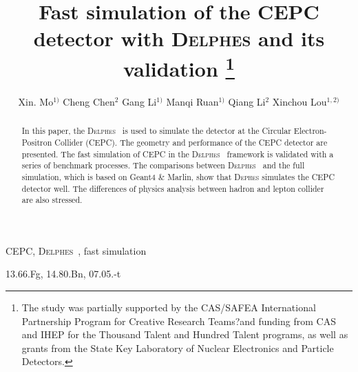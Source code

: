 \documentclass[a4paper,10pt,twoside]{cpc-hepnp}
\begin{document}



\title{Fast simulation of the CEPC detector with {\textsc{Delphes}} and its validation
\thanks{The study was partially supported by the CAS/SAFEA International Partnership Program for Creative Research Teams?and funding from CAS and IHEP for the Thousand Talent and Hundred Talent programs, as well as grants from the State Key Laboratory of Nuclear Electronics and Particle Detectors.}}

\author{%
      Xin. Mo$^{1)}$%
\quad Cheng Chen$^{2}$
\quad Gang Li$^{1)}$%
\quad Manqi Ruan$^{1)}$%
\quad Qiang Li$^{2}$
\quad Xinchou Lou$^{1,2)}$%
}
\maketitle


\address{%
$^1$ Institute of High Energy Physics, Chinese Academy of Sciences, Beijing 100049, China\\
$^2$ Peking University, Beijing, China\\ 
$^3$ University of Texas at Dallas, Richardson, TX 75080-3021, USA
}


\begin{abstract}
In this paper, the {\textsc{Delphes}~} is used to simulate the detector at the Circular Electron-Positron Collider (CEPC).
The geometry and performance of the CEPC detector are presented. The fast simulation of CEPC in the {\textsc{Delphes}~} framework
is validated with  a series of benchmark processes.
The comparisons between {\textsc{Delphes}~} and the full simulation, which is based on Geant4 \& Marlin,
show that {\textsc{Dephes}} simulates the CEPC detector well.
The differences of physics analysis between hadron and lepton collider are also stressed.  
\end{abstract}


\begin{keyword}
CEPC, {\textsc{Delphes}~}, fast simulation
\end{keyword}

\begin{pacs}
13.66.Fg, 14.80.Bn, 07.05.-t
\end{pacs}

%
\end{document}
